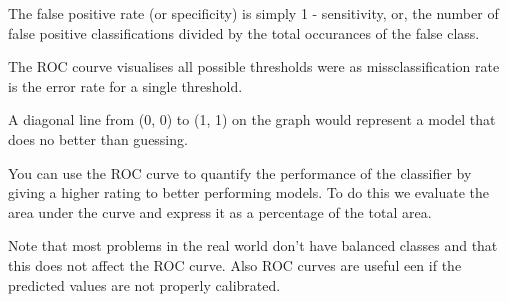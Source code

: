 \documentclass[]{article}
\begin{document}
The false positive rate (or specificity) is simply 1 - sensitivity, or,
the number of false positive classifications divided by the total
occurances of the false class.

The ROC courve visualises all possible thresholds were as
missclassification rate is the error rate for a single threshold.

A diagonal line from (0, 0) to (1, 1) on the graph would represent a
model that does no better than guessing.

You can use the ROC curve to quantify the performance of the classifier
by giving a higher rating to better performing models. To do this we
evaluate the area under the curve and express it as a percentage of the
total area.

Note that most problems in the real world don't have balanced classes
and that this does not affect the ROC curve. Also ROC curves are useful
een if the predicted values are not properly calibrated.
\end{document}
